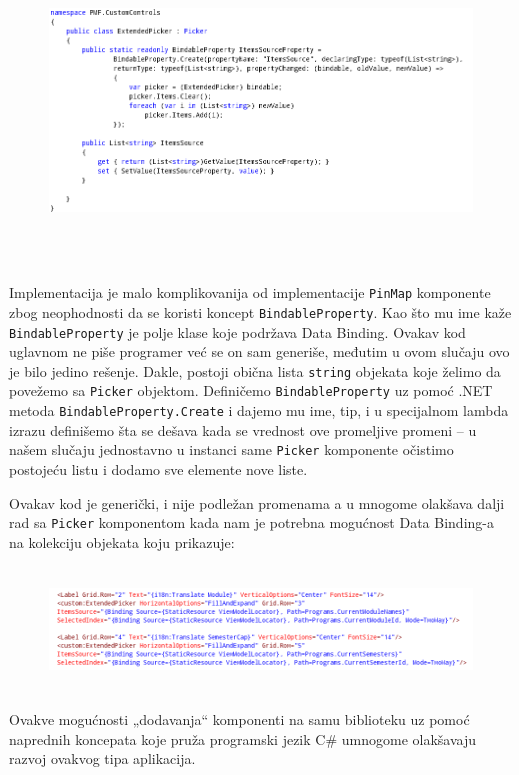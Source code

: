 \documentclass[a4paper]{article}
\begin{document}
\begin{figure}
\centering
\includegraphics[width=170mm,height=81.93mm]{msc-img61.png}
\end{figure}
Implementacija je malo komplikovanija od implementacije
\texttt{\textcolor[rgb]{0.0,0.4,0.8}{PinMap}} komponente zbog
neophodnosti da se koristi koncept
\texttt{\textcolor[rgb]{0.0,0.4,0.8}{BindableProperty}}. Kao što mu ime
kaže \texttt{\textcolor[rgb]{0.0,0.4,0.8}{BindableProperty}} je polje
klase koje podržava Data Binding. Ovakav kod uglavnom ne piše programer
već se on sam generiše, međutim u ovom slučaju ovo je bilo jedino
rešenje. Dakle, postoji obična lista
\texttt{\textcolor[rgb]{0.0,0.4,0.8}{string}} objekata koje želimo da
povežemo sa \texttt{\textcolor[rgb]{0.0,0.4,0.8}{Picker}} objektom.
Definičemo \texttt{\textcolor[rgb]{0.0,0.4,0.8}{BindableProperty}} uz
pomoć .NET metoda
\texttt{\textcolor[rgb]{0.0,0.4,0.8}{BindableProperty.Create}} i dajemo
mu ime, tip, i u specijalnom lambda izrazu definišemo šta se dešava
kada se vrednost ove promeljive promeni – u našem slučaju jednostavno u
instanci same \texttt{\textcolor[rgb]{0.0,0.4,0.8}{Picker}} komponente
očistimo postojeću listu i dodamo sve elemente nove liste. 

Ovakav kod je generički, i nije podležan promenama a u mnogome olakšava
dalji rad sa \texttt{\textcolor[rgb]{0.0,0.4,0.8}{Picker}} komponentom
kada nam je potrebna mogućnost Data Binding-a na kolekciju objekata
koju prikazuje:



\begin{figure}
\centering
\includegraphics[width=170mm,height=33.13mm]{msc-img62.png}
\end{figure}
Ovakve mogućnosti „dodavanja“ komponenti na samu biblioteku uz pomoć
naprednih koncepata koje pruža programski jezik C\# umnogome olakšavaju
razvoj ovakvog tipa aplikacija.
\end{document}
